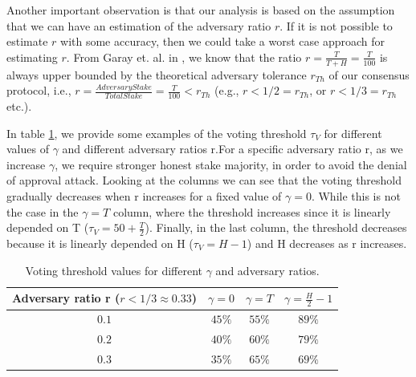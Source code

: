 Another important observation is that our analysis is based on the assumption 
that we can have an estimation of the adversary ratio $r$. If it is not 
possible to estimate $r$ with some accuracy, then we could take a worst case 
approach for estimating $r$. From Garay et. al. in \cite{sok}, we know that the 
ratio $r = \frac{T}{T+H} = \frac{T}{100}$ is always upper bounded by the 
theoretical 
adversary tolerance $r_{Th}$ of our consensus protocol, i.e., $r = 
\frac{AdversaryStake}{TotalStake} = \frac{T}{100} < r_{Th}$ (e.g., $r < 1/2 = 
r_{Th}$, or $r < 1/3 = r_{Th}$ etc.).

In table \ref{table:examples}, we provide some examples of the voting threshold 
$\tau_V$ for different values of $\gamma$ and different adversary ratios r.For 
a specific adversary ratio r, as we increase $\gamma$, we require stronger 
honest stake majority, in order to avoid the denial of approval attack. Looking 
at the columns we can see that the voting threshold gradually decreases when r 
increases for a fixed value of $\gamma = 0$. While this is not the case in the 
$\gamma = T$ column, where the threshold increases since it is linearly 
depended on T ($\tau_V = 50 + \frac{T}{2}$). Finally, in the last column, the 
threshold decreases because it is linearly depended on H ($\tau_V = H - 1$) and 
H decreases as r increases.

\begin{table}[h!]
	\centering
	\begin{tabular}{ | c | c | c | c |} 
		\hline
		Adversary ratio r ($r < 1/3 \approx 0.33$) & $\gamma = 0$ & $\gamma = 
		T$ & $\gamma = \frac{H}{2} - 1$ \\ 
		\hline
		$0.1$ & $45\%$ & $55\%$ & $89\%$ \\ 
		$0.2$ & $40\%$ & $60\%$ & $79\%$ \\ 
		$0.3$ & $35\%$ & $65\%$ & $69\%$ \\ 
		\hline
	\end{tabular}
	\caption{Voting threshold values for different $\gamma$ and adversary 
	ratios.}
	\label{table:examples}
\end{table}



